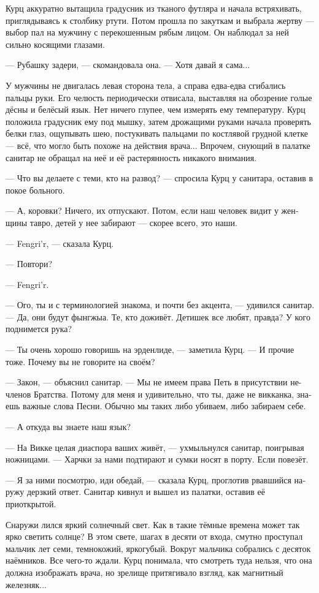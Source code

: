 \documentclass[a4paper,12pt,fleqn]{book}\usepackage{cooltooltips}\usepackage{polyglossia}\setdefaultlanguage[babelshorthands=true]{russian}\setotherlanguage{english}\defaultfontfeatures{Ligatures=TeX,Mapping=tex-text} \usepackage{xcolor}\definecolor{lightgray}{HTML}{bbbbbb}\color{lightgray}\newcommand{\ml}[3]{\textenglish{\textcolor{black}{#3}}}
\begin{document}
Курц аккуратно вытащила градусник из тканого футляра и начала встряхивать, приглядываясь к столбику ртути.
Потом прошла по закуткам и выбрала жертву --- выбор пал на мужчину с перекошенным рябым лицом.
Он наблюдал за ней сильно косящими глазами.

--- Рубашку задери, --- скомандовала она.
--- Хотя давай я сама...

У мужчины не двигалась левая сторона тела, а справа едва-едва сгибались пальцы руки.
Его челюсть периодически отвисала, выставляя на обозрение голые дёсны и белёсый язык.
Нет ничего глупее, чем измерять ему температуру.
Курц положила градусник ему под мышку, затем дрожащими руками начала проверять белки глаз, ощупывать шею, постукивать пальцами по костлявой грудной клетке --- всё, что могло быть похоже на действия врача...
Впрочем, снующий в палатке санитар не обращал на неё и её растерянность никакого внимания.

--- Что вы делаете с теми, кто на развод? --- спросила Курц у санитара, оставив в покое больного.

--- А, коровки?
Ничего, их отпускают.
Потом, если наш человек видит у женщины тавро, детей у нее забирают --- скорее всего, это наши.

--- Fengri'r, --- сказала Курц.

--- Повтори?

--- Fengri'r.

--- Ого, ты и с терминологией знакома, и почти без акцента, --- удивился санитар.
--- Да, они будут фынгжыа.
Те, кто доживёт.
Детишек все любят, правда?
У кого поднимется рука?

--- Ты очень хорошо говоришь на эрденлиде, --- заметила Курц.
--- И прочие тоже.
Почему вы не говорите на своём?

--- Закон, --- объяснил санитар.
--- Мы не имеем права Петь в присутствии не-членов Братства.
Потому для меня и удивительно, что ты, даже не викканка, знаешь важные слова Песни.
Обычно мы таких либо убиваем, либо забираем себе.

--- А откуда вы знаете наш язык?

--- На Викке целая диаспора ваших живёт, --- ухмыльнулся санитар, поигрывая ножницами.
--- Харчки за нами подтирают и сумки носят в порту.
Если повезёт.

--- Я за ними посмотрю, иди обедай, --- сказала Курц, проглотив рвавшийся наружу дерзкий ответ.
Санитар кивнул и вышел из палатки, оставив её приоткрытой.

Снаружи лился яркий солнечный свет.
Как в такие тёмные времена может так ярко светить солнце?
В этом свете, шагах в десяти от входа, смутно проступал мальчик лет семи, темнокожий, яркогубый.
Вокруг мальчика собрались с десяток наёмников.
Все чего-то ждали.
Курц понимала, что смотреть туда нельзя, что она должна изображать врача, но зрелище притягивало взгляд, как магнитный железняк...
\end{document}
